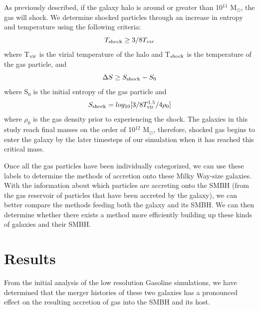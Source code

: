 \documentclass[manuscript]{aastex}
\begin{document}
As previously described, if the galaxy halo is around or greater than 10$^{11}$ M$_{\odot} $, the gas will shock. We determine shocked particles through an increase in entropy and temperature using the following criteria:
\begin{equation}
T_{\rm shock} \geq 3/8 T_{vir}
\end{equation}
where T$_{\rm vir}$ is the virial temperature of the halo and T$_{\rm shock}$ is the temperature of the gas particle, and 
\begin{equation}
\Delta S \geq S_{\rm shock} - S_0
\end{equation}
where S$_0$ is the initial entropy of the gas particle and 
\begin{equation}
S_{\rm shock} = log_{10}[3/8 T_{\rm vir}^{1.5}/4 \rho_0]
\end{equation}
where $\rho_0$ is the gas density prior to experiencing the shock. The galaxies in this study reach final masses on the order of 10$^{12}$ M$_{\odot} $, therefore, shocked gas begins to enter the galaxy by the later timesteps of our simulation when it has reached this critical mass. 


Once all the gas particles have been individually categorized, we can use these labels to determine the methods of accretion onto these Milky Way-size galaxies. With the information about which particles are accreting onto the SMBH (from the gas reservoir of particles that have been accreted by the galaxy), we can better compare the methods feeding both the galaxy and its SMBH. We can then determine whether there exists a method more efficiently building up these kinds of galaxies and their SMBH.

%
%
%
\section{Results} \label{results}

From the initial analysis of the low resolution Gasoline simulations, we have determined that the merger histories of these two galaxies has a pronounced effect on the resulting accretion of gas into the SMBH and its host. 
\end{document}
